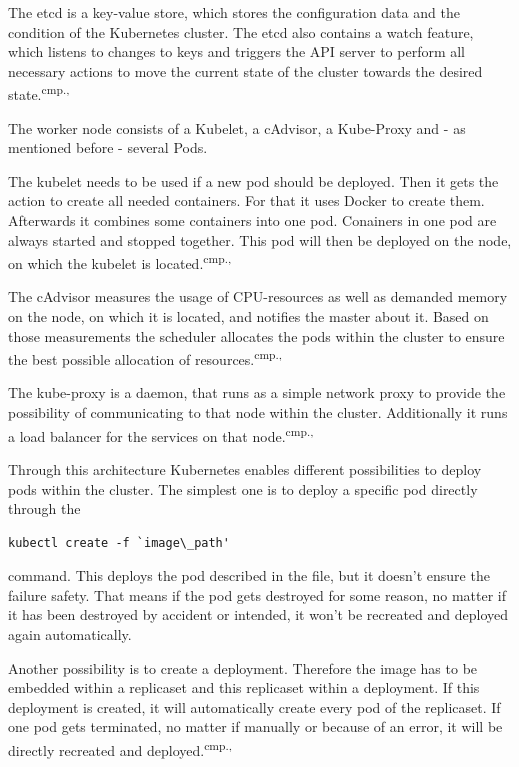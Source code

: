 The etcd is a key-value store, which stores the configuration data and the condition of the Kubernetes cluster. The etcd also contains a watch feature, which listens to changes to keys and triggers the API server to perform all necessary actions to move the current state of the cluster towards the desired state.\textsuperscript{cmp.\cite{13}, \cite{16}}

The worker node consists of a Kubelet, a cAdvisor, a Kube-Proxy and - as mentioned before - several Pods. 

The kubelet needs to be used if a new pod should be deployed. Then it gets the action to create all needed containers. For that it uses Docker to create them. Afterwards it combines some containers into one pod. Conainers in one pod are always started and stopped together. This pod will then be deployed on the node, on which the kubelet is located.\textsuperscript{cmp.\cite{13}, \cite{16}}

The cAdvisor measures the usage of CPU-resources as well as demanded memory on the node, on which it is located, and notifies the master about it. Based on those measurements the scheduler allocates the pods within the cluster to ensure the best possible allocation of resources.\textsuperscript{cmp.\cite{13}, \cite{16}}

The kube-proxy is a daemon, that runs as a simple network proxy to provide the possibility of communicating to that node within the cluster. Additionally it runs a load balancer for the services on that node.\textsuperscript{cmp.\cite{13}, \cite{16}}

Through this architecture Kubernetes enables different possibilities to deploy pods within the cluster. The simplest one is to deploy a specific pod directly through the 
\begin{lstlisting}[caption={Create Kubernetes pod},captionpos=b]
kubectl create -f `image\_path'
\end{lstlisting}
command. This deploys the pod described in the file, but it doesn't ensure the failure safety. That means if the pod gets destroyed for some reason, no matter if it has been destroyed by accident or intended, it won't be recreated and deployed again automatically. 


Another possibility is to create a deployment. Therefore the image has to be embedded within a replicaset and this replicaset within a deployment. If this deployment is created, it will automatically create every pod of the replicaset. If one pod gets terminated, no matter if manually or because of an error, it will be directly recreated and deployed.\textsuperscript{cmp.\cite{13}, \cite{18}}

